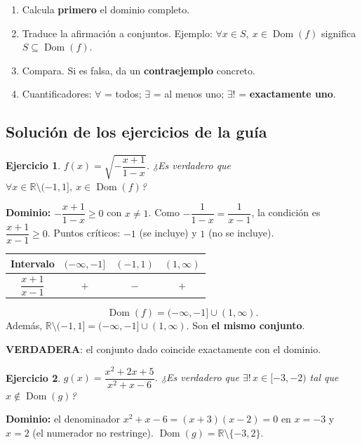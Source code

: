 \documentclass[11pt,a4paper]{article}
\theoremstyle{ej}
\newtheorem{ejercicio}{Ejercicio}[section]
\newcommand{\R}{\mathbb{R}}
\newcommand{\dom}{\operatorname{Dom}}
\begin{document}
\begin{metodo}
\begin{enumerate}[nosep]
  \item Calcula \textbf{primero} el dominio completo.
  \item Traduce la afirmación a conjuntos. Ejemplo: $\forall x\in S,\ x\in\dom(f)$ significa $S\subseteq\dom(f)$.
  \item Compara. Si es falsa, da un \textbf{contraejemplo} concreto.
  \item Cuantificadores: $\forall$ = todos; $\exists$ = al menos uno; $\exists!$ = \textbf{exactamente uno}.
\end{enumerate}
\end{metodo}

\subsection{Solución de los ejercicios de la guía}

\begin{ejercicio}
$f(x)=\sqrt{-\dfrac{x+1}{1-x}}$. ¿Es verdadero que $\forall x\in\R\setminus(-1,1],\ x\in\dom(f)$?
\end{ejercicio}

\textbf{Dominio:} $-\dfrac{x+1}{1-x}\ge0$ con $x\ne1$. Como $-\dfrac{1}{1-x}=\dfrac1{x-1}$, la condición es
$\dfrac{x+1}{x-1}\ge0$. Puntos críticos: $-1$ (se incluye) y $1$ (no se incluye).
\begin{center}
\begin{tabular}{c|ccc}
Intervalo & $(-\infty,-1]$ & $(-1,1)$ & $(1,\infty)$\\ \hline
$\dfrac{x+1}{x-1}$ & $+$ & $-$ & $+$
\end{tabular}
\end{center}
\[ \dom(f)=(-\infty,-1]\cup(1,\infty). \]
Además, $\R\setminus(-1,1]=(-\infty,-1]\cup(1,\infty)$. Son \textbf{el mismo conjunto}.
\begin{respuesta}
\textbf{VERDADERA}: el conjunto dado coincide exactamente con el dominio.
\end{respuesta}

\begin{ejercicio}
$g(x)=\dfrac{x^2+2x+5}{x^2+x-6}$. ¿Es verdadero que $\exists!\,x\in[-3,-2)$ tal que $x\notin\dom(g)$?
\end{ejercicio}

\textbf{Dominio:} el denominador $x^2+x-6=(x+3)(x-2)=0$ en $x=-3$ y $x=2$ (el numerador no restringe).
$\dom(g)=\R\setminus\{-3,2\}$.
\end{document}

